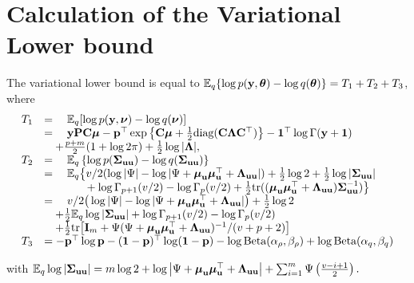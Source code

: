 \section{Calculation of the Variational Lower bound} 
\label{sec:calculation_of_var_lb}
		
The variational lower bound is equal to ${\mathbb E}_q\{\log{p({\bf y}, {\boldsymbol\theta})} - \log{q({\boldsymbol\theta})}\} = T_1 + T_2 + T_3$,
where
\begin{equation*}
\begin{array}{rl}
	T_1 & = \quad \bE_q[\log{p(\vy, \vnu)} - \log{q(\vnu)}]\\
	    & = \quad \vy \mP \mC \vmu - \vp^\top \exp{\left\{ \mC \vmu + \frac{1}{2} \text{diag} (\mC \mLambda \mC^\top) \right\}} - \vone^\top\log \Gamma{(\vy + \vone)}\\
	    & \quad + \frac{p + m}{2} (1 + \log{2 \pi}) + \frac{1}{2} \log{|\mLambda|},\\
	T_2 & = \quad \bE_q \left\{ \log p(\mSigma_{\vu \vu}) - \log q(\mSigma_{\vu \vu}) \right\}\\
	    & = \quad \bE_q \big\{ v/2(\log |\Psi| - \log |\Psi + \vmu_\vu \vmu_\vu^\top + \mLambda_{\vu \vu}|) + \frac{1}{2} \log 2 + \frac{1}{2} \log|\mSigma_{\vu \vu}| \\
	    & \qquad \hphantom{\bE_q \{} + \log \Gamma_{p+1}(v/2) - \log \Gamma_{p}(v/2)    
	    + \frac{1}{2} \tr((\vmu_{\vu} \vmu_{\vu}^\top + \mLambda_{\vu \vu}) \mSigma_{\vu \vu}^{-1}) \big\} \\
	    & = \quad v/2\big(\log |\Psi| - \log |\Psi + \vmu_\vu \vmu_\vu^\top + \mLambda_{\vu \vu}|\big) + \frac{1}{2} \log 2 \\
	    & \quad + \frac{1}{2} \bE_q \log |\mSigma_{\vu \vu}| + \log \Gamma_{p+1}(v/2) - \log \Gamma_{p}(v/2) \\
	    & \quad + \frac{1}{2} \tr\big[\mI_m + \Psi(\Psi+ \vmu_\vu \vmu_\vu^\top + \mLambda_{\vu \vu})^{-1}/(v + p + 2)\big] \\
	T_3 & = - \vp^\top \log \vp - (\vone - \vp)^\top \log (\vone - \vp) - \log \Beta (\alpha_\rho, \beta_\rho) + \log \Beta (\alpha_q, \beta_q)                                                              
\end{array}
\end{equation*}
		
\noindent with ${\mathbb E}_q \log |{\boldsymbol \Sigma}_{{\bf u} {\bf u}}| = m \log 2 + \log \left | \Psi + {\boldsymbol \mu}_{\bf u} {\boldsymbol \mu}_{\bf u}^\top + {\boldsymbol \Lambda}_{{\bf u} {\bf u}} \right | + \sum_{i=1}^m \Psi \left ( \frac{v - i + 1}{2} \right ).$

